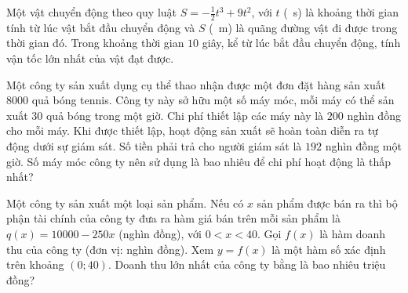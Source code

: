 \begin{baitap}
	Một vật chuyển động theo quy luật $S = -\frac{1}{2}t^3 + 9t^2$, với $t$ (\SI{}{\second}) là khoảng thời gian tính từ lúc vật bắt đầu chuyển động và $S$ (\SI{}{\meter}) là quãng đường vật đi được trong thời gian đó. Trong khoảng thời gian $10$ giây, kể từ lúc bắt đầu chuyển động, tính vận tốc lớn nhất của vật đạt được.
\end{baitap}

\begin{baitap}
	Một công ty sản xuất dụng cụ thể thao nhận được một đơn đặt hàng sản xuất \num{8000} quả bóng tennis. Công ty này sở hữu một số máy móc, mỗi máy có thể sản xuất $30$ quả bóng trong một giờ. Chi phí thiết lập các máy này là $200$ nghìn đồng cho mỗi máy. Khi được thiết lập, hoạt động sản xuất sẽ hoàn toàn diễn ra tự động dưới sự giám sát. Số tiền phải trả cho người giám sát là $192$ nghìn đồng một giờ. Số máy móc công ty nên sử dụng là bao nhiêu để chi phí hoạt động là thấp nhất?
\end{baitap}

\begin{baitap}
	Một công ty sản xuất một loại sản phẩm. Nếu có $x$ sản phẩm được bán ra thì bộ phận tài chính của công ty đưa ra hàm giá bán trên mỗi sản phẩm là $q(x) = 10000 - 250x$ (nghìn đồng), với $0 < x < 40$. Gọi $f(x)$ là hàm doanh thu của công ty (đơn vị: nghìn đồng). Xem $y = f(x)$ là một hàm số xác định trên khoảng $(0; 40)$. Doanh thu lớn nhất của công ty bằng là bao nhiêu triệu đồng?
\end{baitap}